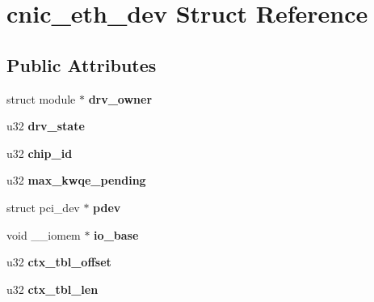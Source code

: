 \hypertarget{structcnic__eth__dev}{
\section{cnic\_\-eth\_\-dev Struct Reference}
\label{structcnic__eth__dev}
}
\subsection*{Public Attributes}
\begin{DoxyCompactItemize}
\item 
\hypertarget{structcnic__eth__dev_ac595a48ebfb87203a49c09d3a621e7d1}{
struct module $\ast$ {\bfseries drv\_\-owner}}
\label{structcnic__eth__dev_ac595a48ebfb87203a49c09d3a621e7d1}

\item 
\hypertarget{structcnic__eth__dev_a244f403ec88dd4e17a3f007e95557ecc}{
u32 {\bfseries drv\_\-state}}
\label{structcnic__eth__dev_a244f403ec88dd4e17a3f007e95557ecc}

\item 
\hypertarget{structcnic__eth__dev_abac23dbfbef2c1a3aea59d2af0d4dddb}{
u32 {\bfseries chip\_\-id}}
\label{structcnic__eth__dev_abac23dbfbef2c1a3aea59d2af0d4dddb}

\item 
\hypertarget{structcnic__eth__dev_a972266c8a3d0ffe4fecd8f1e9d81f7e8}{
u32 {\bfseries max\_\-kwqe\_\-pending}}
\label{structcnic__eth__dev_a972266c8a3d0ffe4fecd8f1e9d81f7e8}

\item 
\hypertarget{structcnic__eth__dev_a939121dfa3cd569b8e60a3e25a01f695}{
struct pci\_\-dev $\ast$ {\bfseries pdev}}
\label{structcnic__eth__dev_a939121dfa3cd569b8e60a3e25a01f695}

\item 
\hypertarget{structcnic__eth__dev_a4b6e3a111a3611f7e90a1f134498e6e7}{
void \_\-\_\-iomem $\ast$ {\bfseries io\_\-base}}
\label{structcnic__eth__dev_a4b6e3a111a3611f7e90a1f134498e6e7}

\item 
\hypertarget{structcnic__eth__dev_ae55009987b9e4c8a08f6fe0030696aad}{
u32 {\bfseries ctx\_\-tbl\_\-offset}}
\label{structcnic__eth__dev_ae55009987b9e4c8a08f6fe0030696aad}

\item 
\hypertarget{structcnic__eth__dev_ad8f6da29ded456f42ba9f2e3cac269c5}{
u32 {\bfseries ctx\_\-tbl\_\-len}}
\label{structcnic__eth__dev_ad8f6da29ded456f42ba9f2e3cac269c5}


\end{DoxyCompactItemize}
